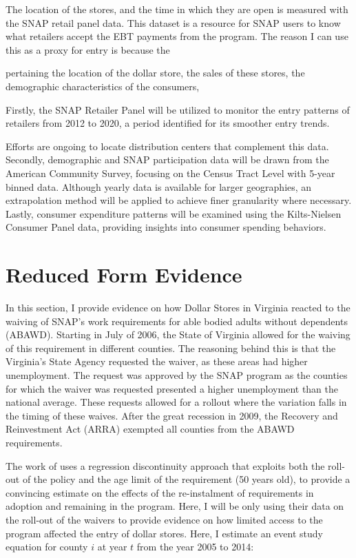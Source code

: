 \documentclass[11.5pt]{article}
\begin{document}
The location of the stores, and the time in which they are open is measured with the SNAP retail panel data. This dataset is a resource for SNAP users to know what retailers accept the EBT payments from the program. The reason I can use this as a proxy for entry is because the 

pertaining the location of the dollar store, the sales of these stores, the demographic characteristics of the consumers, 


Firstly, the SNAP Retailer Panel will be utilized to monitor the entry patterns of retailers from 2012 to 2020, a period identified for its smoother entry trends.


Efforts are ongoing to locate distribution centers that complement this data. Secondly, demographic and SNAP participation data will be drawn from the American Community Survey, focusing on the Census Tract Level with 5-year binned data. Although yearly data is available for larger geographies, an extrapolation method will be applied to achieve finer granularity where necessary. Lastly, consumer expenditure patterns will be examined using the Kilts-Nielsen Consumer Panel data, providing insights into consumer spending behaviors.


\section{Reduced Form Evidence}

In this section, I provide evidence on how Dollar Stores in Virginia reacted to the waiving of SNAP's work requirements for able bodied adults without dependents (ABAWD). Starting in July of 2006, the State of Virginia allowed for the waiving of this requirement in different counties. The reasoning behind this is that the Virginia's State Agency requested the waiver, as these areas had higher unemployment. The request was approved by the SNAP program as the counties for which the waiver was requested presented a higher unemployment than the national average. These requests allowed for a rollout where the variation falls in the timing of these waives. After the great recession in 2009, the Recovery and Reinvestment Act (ARRA) exempted all counties from the ABAWD requirements. 


The work of \citeauthor{gray2023employed} \citeyear{gray2023employed} uses a regression discontinuity approach that exploits both the roll-out of the policy and the age limit of the requirement (50 years old), to provide a convincing estimate on the effects of the re-instalment of requirements in adoption and remaining in the program. Here, I will be only using their data on the roll-out of the waivers to provide evidence on how limited access to the program affected the entry of dollar stores. Here, I estimate an event study equation for county $i$ at year $t$ from the year 2005 to 2014:
\end{document}
